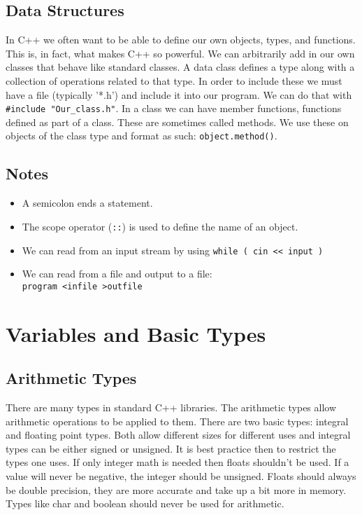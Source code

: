\documentclass[12pt, a4paper]{report}
\begin{document}
\section{Data Structures}
In C++ we often want to be able to define our own objects, types, and functions. This is, in fact, what makes C++ so powerful. We can arbitrarily add in our own classes that behave like standard classes. 
A data class defines a type along with a collection of operations related to that type. In order to include these we must have a file (typically '*.h') and include it into our program. We can do that with \verb|#include "Our_class.h"|. In a class we can have member functions, functions defined as part of a class.
These are sometimes called methods. We use these on objects of the class type and format as such: \verb|object.method()|.
\section{Notes}

\begin{itemize}
	\item A semicolon ends a statement.
	\item The scope operator (\verb|::|) is used to define the name of an object.
	\item We can read from an input stream by using \verb|while ( cin << input )|
	\item We can read from a file and output to a file: \\ \verb|program <infile >outfile|
\end{itemize}

\chapter{Variables and Basic Types}
\section{Arithmetic Types}
There are many types in standard C++ libraries. The arithmetic types allow arithmetic operations to be applied to them. There are two basic types: integral and floating point types. Both allow different sizes for different uses and integral types can be either signed or unsigned.
It is best practice then to restrict the types one uses. If only integer math is needed then floats shouldn't be used. If a value will never be negative, the integer should be unsigned. 
Floats should always be double precision, they are more accurate and take up a bit more in memory.
Types like char and boolean should never be used for arithmetic.
\end{document}
